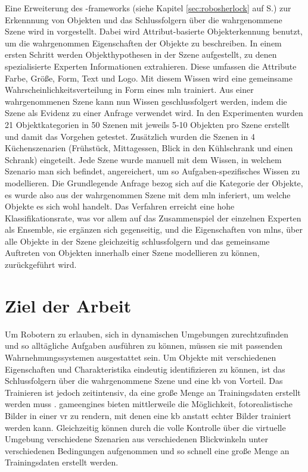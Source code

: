Eine Erweiterung des \robosherlock-\glspl{framework} (siehe Kapitel \ref{sec:robosherlock} auf S.\pageref{sec:robosherlock}) zur Erkennnung von Objekten und das Schlussfolgern über die wahrgenommene Szene wird in \cite{pr2looking} vorgestellt. Dabei wird Attribut-basierte Objekterkennung benutzt, um die wahrgenommen Eigenschaften der Objekte zu beschreiben. In einem ersten Schritt werden Objekthypothesen in der Szene aufgestellt, zu denen spezialisierte Experten Informationen extrahieren. Diese umfassen die Attribute Farbe, Größe, Form, Text und Logo. Mit diesem Wissen wird eine gemeinsame Wahrscheinlichkeitsverteilung in Form eines \gls{mln} trainiert. Aus einer wahrgenommenen Szene kann nun Wissen geschlussfolgert werden, indem die Szene als Evidenz zu einer Anfrage verwendet wird. In den Experimenten wurden 21 Objektkategorien in 50 Szenen mit jeweils 5-10 Objekten pro Szene erstellt und damit das Vorgehen getestet. Zusätzlich wurden die Szenen in 4 Küchenszenarien (Frühstück, Mittagessen, Blick in den Kühlschrank und einen Schrank) eingeteilt. Jede Szene wurde manuell mit dem Wissen, in welchem Szenario man sich befindet, angereichert, um so Aufgaben-spezifisches Wissen zu modellieren. Die Grundlegende Anfrage bezog sich auf die Kategorie der Objekte, es wurde also aus der wahrgenommen Szene mit dem \gls{mln} inferiert, um welche Objekte es sich wohl handelt. Das Verfahren erreicht eine hohe Klassifikationsrate, was vor allem auf das Zusammenspiel der einzelnen Experten als Ensemble, sie ergänzen sich gegenseitig, und die Eigenschaften von \glspl{mln}, über alle Objekte in der Szene gleichzeitig schlussfolgern und das gemeinsame Auftreten von Objekten innerhalb einer Szene modellieren zu können, zurückgeführt wird.

\section{Ziel der Arbeit}
\label{sec:goal}

Um Robotern zu erlauben, sich in dynamischen Umgebungen zurechtzufinden und so alltägliche Aufgaben ausführen zu können, müssen sie mit passenden Wahrnehmungssystemen ausgestattet sein. Um Objekte mit verschiedenen Eigenschaften und Charakteristika eindeutig identifizieren zu können, ist das Schlussfolgern über die wahrgenommene Szene und eine \gls{kb} von Vorteil. Das Trainieren ist jedoch zeitintensiv, da eine große Menge an Trainingsdaten erstellt werden muss \cite{burger1995}. \glspl{gameengine} bieten mittlerweile die Möglichkeit, fotorealistische Bilder in einer \acrlong{vr} zu rendern, mit denen eine \gls{kb} anstatt echter Bilder trainiert werden kann. Gleichzeitig können durch die volle Kontrolle über die virtuelle Umgebung verschiedene Szenarien aus verschiedenen Blickwinkeln unter verschiedenen Bedingungen aufgenommen und so schnell eine große Menge an Trainingsdaten erstellt werden. \par 

